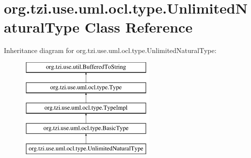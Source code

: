 \hypertarget{classorg_1_1tzi_1_1use_1_1uml_1_1ocl_1_1type_1_1_unlimited_natural_type}{\section{org.\-tzi.\-use.\-uml.\-ocl.\-type.\-Unlimited\-Natural\-Type Class Reference}
\label{classorg_1_1tzi_1_1use_1_1uml_1_1ocl_1_1type_1_1_unlimited_natural_type}
}
Inheritance diagram for org.\-tzi.\-use.\-uml.\-ocl.\-type.\-Unlimited\-Natural\-Type\-:\begin{figure}[H]
\begin{center}
\leavevmode
\includegraphics[height=5.000000cm]{classorg_1_1tzi_1_1use_1_1uml_1_1ocl_1_1type_1_1_unlimited_natural_type}
\end{center}
\end{figure}
